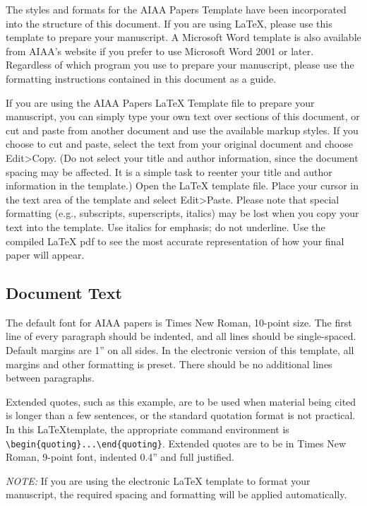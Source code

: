The styles and formats for the AIAA Papers Template have been incorporated into the structure of this document. If you are using \LaTeX{}, please use this template to prepare your manuscript. A Microsoft Word template is also available from AIAA's website if you prefer to use Microsoft Word 2001 or later. Regardless of which program you use to prepare your manuscript, please use the formatting instructions contained in this document as a guide.

If you are using the AIAA Papers \LaTeX{} Template file to prepare your manuscript, you can simply type your own text over sections of this document, or cut and paste from another document and use the available markup styles. If you choose to cut and paste, select the text from your original document and choose Edit>Copy. (Do not select your title and author information, since the document spacing may be affected. It is a simple task to reenter your title and author information in the template.) Open the \LaTeX{} template file. Place your cursor in the text area of the template and select Edit>Paste. Please note that special formatting (e.g., subscripts, superscripts, italics) may be lost when you copy your text into the template. Use italics for emphasis; do not underline. Use the compiled \LaTeX{} pdf to see the most accurate representation of how your final paper will appear.

\subsection{Document Text}
The default font for AIAA papers is Times New Roman, 10-point size.  The first line of every paragraph should be indented, and all lines should be single-spaced. Default margins are 1'' on all sides. In the electronic version of this template, all margins and other formatting is preset. There should be no additional lines between paragraphs.

\begin{quoting}
Extended quotes, such as this example, are to be used when material being cited is longer than a few sentences, or the standard quotation format is not practical. In this \LaTeX template, the appropriate command environment is \verb|\begin{quoting}...\end{quoting}|. Extended quotes are to be in Times New Roman, 9-point font, indented 0.4'' and full justified.
\end{quoting}

\emph{NOTE:} If you are using the electronic \LaTeX{} template to format your manuscript, the required spacing and formatting will be applied automatically.

